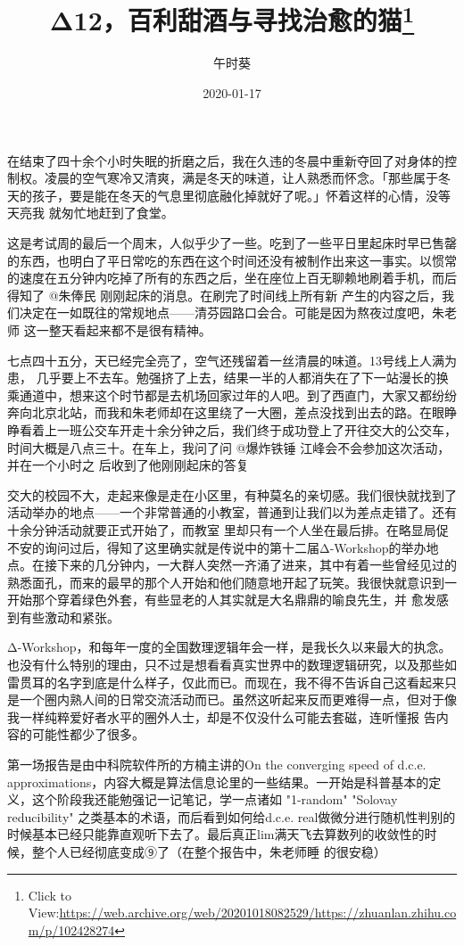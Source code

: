 \documentclass{article}
\title{Δ12，百利甜酒与寻找治愈的猫\footnote{Click to View:\url{https://web.archive.org/web/20201018082529/https://zhuanlan.zhihu.com/p/102428274}}}
\author{午时葵}
\date{2020-01-17}
\begin{document}

\maketitle


\Large

﻿在结束了四十余个小时失眠的折磨之后，我在久违的冬晨中重新夺回了对身体的控制权。凌晨的空气寒冷又清爽，满是冬天的味道，让人熟悉而怀念。「那些属于冬天的孩子，要是能在冬天的气息里彻底融化掉就好了呢。」怀着这样的心情，没等天亮我
就匆忙地赶到了食堂。 

这是考试周的最后一个周末，人似乎少了一些。吃到了一些平日里起床时早已售罄的东西，也明白了平日常吃的东西在这个时间还没有被制作出来这一事实。以惯常的速度在五分钟内吃掉了所有的东西之后，坐在座位上百无聊赖地刷着手机，而后得知了 
@朱俸民
 刚刚起床的消息。在刷完了时间线上所有新
\newpage
产生的内容之后，我们决定在一如既往的常规地点——清芬园路口会合。可能是因为熬夜过度吧，朱老师
这一整天看起来都不是很有精神。 

七点四十五分，天已经完全亮了，空气还残留着一丝清晨的味道。13号线上人满为患， 几乎要上不去车。勉强挤了上去，结果一半的人都消失在了下一站漫长的换乘通道中，想来这个时节都是去机场回家过年的人吧。到了西直门，大家又都纷纷奔向北京北站，而我和朱老师却在这里绕了一大圈，差点没找到出去的路。在眼睁睁看着上一班公交车开走十余分钟之后，我们终于成功登上了开往交大的公交车，时间大概是八点三十。在车上，我问了问 
@爆炸铁锤
 江峰会不会参加这次活动，并在一个小时之
后收到了他刚刚起床的答复 

交大的校园不大，走起来像是走在小区里，有种莫名的亲切感。我们很快就找到了活动举办的地点——一个非常普通的小教室，普通到让我们以为差点走错了。还有十余分钟活动就要正式开始了，而教室
\newpage
里却只有一个人坐在最后排。在略显局促不安的询问过后，得知了这里确实就是传说中的第十二届Δ-Workshop的举办地点。在接下来的几分钟内，一大群人突然一齐涌了进来，其中有着一些曾经见过的熟悉面孔，而来的最早的那个人开始和他们随意地开起了玩笑。我很快就意识到一开始那个穿着绿色外套，有些显老的人其实就是大名鼎鼎的喻良先生，并
愈发感到有些激动和紧张。 

Δ-Workshop，和每年一度的全国数理逻辑年会一样，是我长久以来最大的执念。也没有什么特别的理由，只不过是想看看真实世界中的数理逻辑研究，以及那些如雷贯耳的名字到底是什么样子，仅此而已。而现在，我不得不告诉自己这看起来只是一个圈内熟人间的日常交流活动而已。虽然这听起来反而更难得一点，但对于像我一样纯粹爱好者水平的圈外人士，却是不仅没什么可能去套磁，连听懂报
告内容的可能性都少了很多。 

第一场报告是由中科院软件所的方楠主讲的On the converging speed 
\newpage
of d.c.e. approximations，内容大概是算法信息论里的一些结果。一开始是科普基本的定义，这个阶段我还能勉强记一记笔记，学一点诸如 "1-random" "Solovay reducibility" 之类基本的术语，而后看到如何给d.c.e. real做微分进行随机性判别的时候基本已经只能靠直观听下去了。最后真正lim满天飞去算数列的收敛性的时候，整个人已经彻底变成⑨了（在整个报告中，朱老师睡
的很安稳） 
\end{document}
